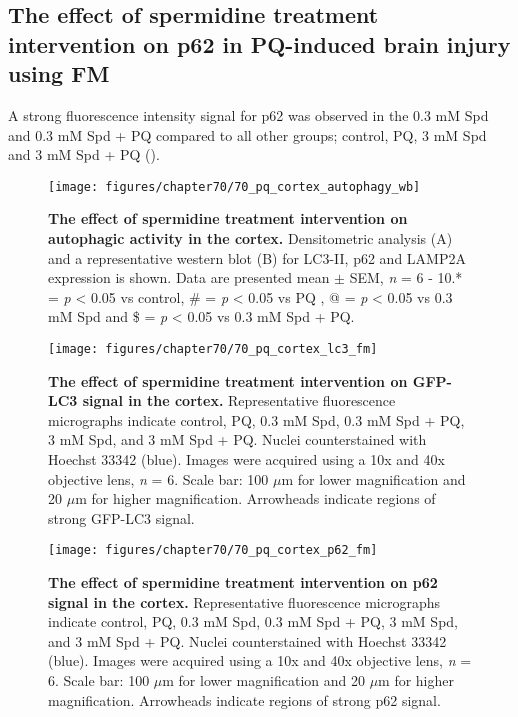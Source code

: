 \subsection{The effect of spermidine treatment intervention on p62 in PQ-induced brain injury using FM}
A strong fluorescence intensity signal for p62 was observed in the 0.3 mM Spd and 0.3 mM Spd + PQ compared to all other groups; control, PQ, 3 mM Spd and 3 mM Spd + PQ ().

\begin{landscape}
\begin{figure}[!htbp]
\center
  \texttt{[image: figures/chapter70/70\_pq\_cortex\_autophagy\_wb]}
  \caption[The effect of spermidine treatment intervention on autophagic activity in the cortex]{\textbf{The effect of spermidine treatment intervention on autophagic activity in the cortex.} Densitometric analysis (A) and a representative western blot (B) for LC3-II, p62 and LAMP2A expression is shown. Data are presented  mean $\pm$ SEM, \textit{n} = 6 - 10.* = \textit{p} < 0.05 vs control, \# = \textit{p} < 0.05 vs PQ , @ = \textit{p} < 0.05 vs 0.3 mM Spd and \$ = \textit{p} < 0.05 vs 0.3 mM Spd + PQ.}
  \label{fig:70_pq_cortex_autophagy_wb}
\end{figure} 
\end{landscape}

\begin{landscape}
\begin{figure}[!htbp]
\center
  \texttt{[image: figures/chapter70/70\_pq\_cortex\_lc3\_fm]}
  \caption[The effect of spermidine treatment intervention on GFP-LC3 signal in the cortex]{\textbf{The effect of spermidine treatment intervention on GFP-LC3 signal in the cortex.} Representative fluorescence micrographs indicate control, PQ, 0.3 mM Spd, 0.3 mM Spd + PQ, 3 mM Spd, and 3 mM Spd + PQ. Nuclei counterstained with Hoechst 33342 (blue). Images were acquired using a 10x and 40x objective lens, \textit{n} = 6. Scale bar: 100 $\mu$m for lower magnification and 20 $\mu$m for higher magnification. Arrowheads indicate regions of strong GFP-LC3 signal.}
  \label{fig:70_pq_cortex_lc3_fm}
\end{figure} 
\end{landscape}

\begin{landscape}
\begin{figure}[!htbp]
\center
  \texttt{[image: figures/chapter70/70\_pq\_cortex\_p62\_fm]}
  \caption[The effect of spermidine treatment intervention on p62 signal in the cortex]{\textbf{The effect of spermidine treatment intervention on p62 signal in the cortex.} Representative fluorescence micrographs indicate control, PQ, 0.3 mM Spd, 0.3 mM Spd + PQ, 3 mM Spd, and 3 mM Spd + PQ. Nuclei counterstained with Hoechst 33342 (blue). Images were acquired using a 10x and 40x objective lens, \textit{n} = 6. Scale bar: 100 $\mu$m for lower magnification and 20 $\mu$m for higher magnification. Arrowheads indicate regions of strong p62 signal.}
  \label{fig:70_pq_cortex_p62_fm}
\end{figure} 
\end{landscape}

